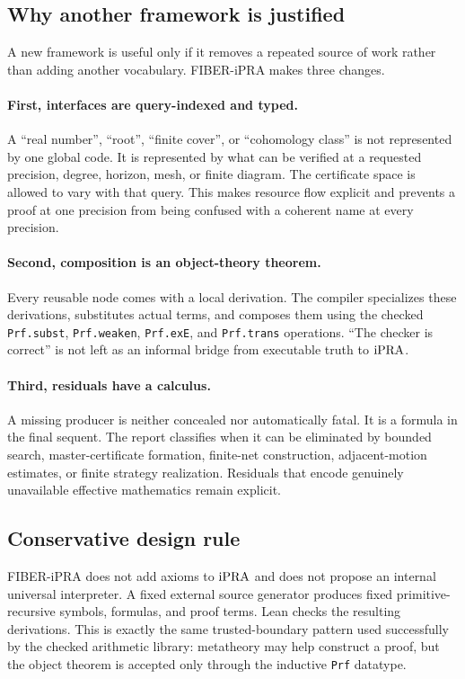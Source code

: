 \subsection{Why another framework is justified}

A new framework is useful only if it removes a repeated source of work rather
than adding another vocabulary.  FIBER-iPRA makes three changes.

\paragraph{First, interfaces are query-indexed and typed.}
A ``real number'', ``root'', ``finite cover'', or ``cohomology class'' is not
represented by one global code.  It is represented by what can be verified at
a requested precision, degree, horizon, mesh, or finite diagram.  The
certificate space is allowed to vary with that query.  This makes resource
flow explicit and prevents a proof at one precision from being confused with
a coherent name at every precision.

\paragraph{Second, composition is an object-theory theorem.}
Every reusable node comes with a local derivation.  The compiler specializes
these derivations, substitutes actual terms, and composes them using the
checked \texttt{Prf.subst}, \texttt{Prf.weaken}, \texttt{Prf.exE}, and
\texttt{Prf.trans} operations.  ``The checker is correct'' is not left as an
informal bridge from executable truth to \(\mathrm{iPRA}\).

\paragraph{Third, residuals have a calculus.}
A missing producer is neither concealed nor automatically fatal.  It is a
formula in the final sequent.  The report classifies when it can be eliminated
by bounded search, master-certificate formation, finite-net construction,
adjacent-motion estimates, or finite strategy realization.  Residuals that
encode genuinely unavailable effective mathematics remain explicit.

\subsection{Conservative design rule}

FIBER-iPRA does not add axioms to \(\mathrm{iPRA}\) and does not propose an internal
universal interpreter.  A fixed external source generator produces fixed
primitive-recursive symbols, formulas, and proof terms.  Lean checks the
resulting derivations.  This is exactly the same trusted-boundary pattern used
successfully by the checked arithmetic library: metatheory may help construct
a proof, but the object theorem is accepted only through the inductive
\texttt{Prf} datatype.
